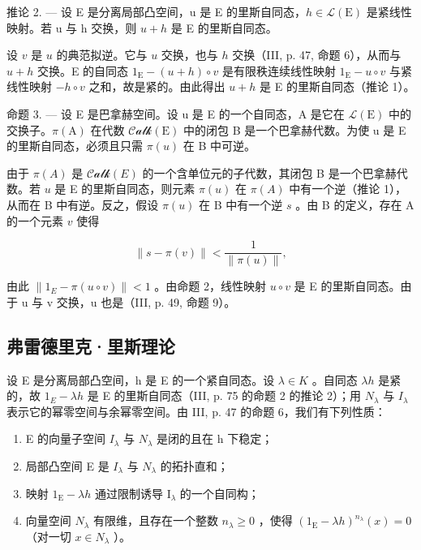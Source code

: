 推论 2. --- 设 E 是分离局部凸空间，u 是 E 的里斯自同态，\(h \in \mathcal{L}(\mathrm{E})\) 是紧线性映射。若 u 与 h 交换，则 \(u + h\) 是 E 的里斯自同态。

设 \(v\) 是 \(u\) 的典范拟逆。它与 \(u\) 交换，也与 \(h\) 交换（III, p. 47, 命题 6），从而与 \(u + h\) 交换。E 的自同态 \(1_{\mathrm{E}} - (u + h) \circ v\) 是有限秩连续线性映射 \(1_{\mathrm{E}} - u \circ v\) 与紧线性映射 \(-h \circ v\) 之和，故是紧的。由此得出 \(u + h\) 是 E 的里斯自同态（推论 1）。

命题 3. --- 设 E 是巴拿赫空间。设 u 是 E 的一个自同态，A 是它在 \(\mathcal{L}(\mathrm{E})\) 中的交换子。\(\pi(\mathrm{A})\) 在代数 \(\mathcal{Calk}(\mathrm{E})\) 中的闭包 B 是一个巴拿赫代数。为使 u 是 E 的里斯自同态，必须且只需 \(\pi(u)\) 在 B 中可逆。

由于 \(\pi(A)\) 是 \(\mathcal{Calk}(E)\) 的一个含单位元的子代数，其闭包 B 是一个巴拿赫代数。若 \(u\) 是 E 的里斯自同态，则元素 \(\pi(u)\) 在 \(\pi(A)\) 中有一个逆（推论 1），从而在 B 中有逆。反之，假设 \(\pi(u)\) 在 B 中有一个逆 \(s\) 。由 B 的定义，存在 A 的一个元素 \(v\) 使得

\[
\left\| s - \pi (v) \right\| <   \frac {1}{\left\| \pi (u) \right\|},
\]

由此 \(\|1_{E}-\pi(u\circ v)\|<1\) 。由命题 2，线性映射 \(u\circ v\) 是 E 的里斯自同态。由于 u 与 v 交换，u 也是（III, p. 49, 命题 9）。

\subsection{弗雷德里克·里斯理论}

设 E 是分离局部凸空间，h 是 E 的一个紧自同态。设 \(\lambda \in K\) 。自同态 \(\lambda h\) 是紧的，故 \(1_{E} - \lambda h\) 是 E 的里斯自同态（III, p. 75 的命题 2 的推论 2）；用 \(N_{\lambda}\) 与 \(I_{\lambda}\) 表示它的幂零空间与余幂零空间。由 III, p. 47 的命题 6，我们有下列性质：

\begin{enumerate}
\def\labelenumi{(\roman{enumi})}
\item
  E 的向量子空间 \(I_{\lambda}\) 与 \(N_{\lambda}\) 是闭的且在 h 下稳定；
\item
  局部凸空间 E 是 \(I_{\lambda}\) 与 \(N_{\lambda}\) 的拓扑直和；
\item
  映射 \(1_{\mathrm{E}} - \lambda h\) 通过限制诱导 \(\mathrm{I}_{\lambda}\) 的一个自同构；
\item
  向量空间 \(N_{\lambda}\) 有限维，且存在一个整数 \(n_{\lambda} \geqslant 0\) ，使得 \((1_{\mathrm{E}} - \lambda h)^{n_{\lambda}}(x) = 0\) （对一切 \(x \in N_{\lambda}\) ）。
\end{enumerate}


